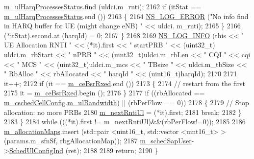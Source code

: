 \begin{DoxyCode}
      \hyperlink{classns3_1_1PssFfMacScheduler_a80badd341a079bd237ef7fe60db2cb79}{m\_ulHarqProcessesStatus}.find (uldci.m\_rnti);
2162           \textcolor{keywordflow}{if} (itStat == \hyperlink{classns3_1_1PssFfMacScheduler_a80badd341a079bd237ef7fe60db2cb79}{m\_ulHarqProcessesStatus}.end ())
2163             \{
2164               \hyperlink{group__logging_ga0261a8db1d4ac5f79417d117634fd455}{NS\_LOG\_ERROR} (\textcolor{stringliteral}{"No info find in HARQ buffer for UE (might change eNB) "} << uldci.
      m\_rnti);
2165             \}
2166           (*itStat).second.at (harqId) = 0;
2167         \}
2168 
2169       \hyperlink{group__logging_gafbd73ee2cf9f26b319f49086d8e860fb}{NS\_LOG\_INFO} (\textcolor{keyword}{this} << \textcolor{stringliteral}{" UE Allocation RNTI "} << (*it).first << \textcolor{stringliteral}{" startPRB "} << (uint32\_t)
      uldci.m\_rbStart << \textcolor{stringliteral}{" nPRB "} << (uint32\_t)uldci.m\_rbLen << \textcolor{stringliteral}{" CQI "} << cqi << \textcolor{stringliteral}{" MCS "} << (uint32\_t)uldci.m\_mcs 
      << \textcolor{stringliteral}{" TBsize "} << uldci.m\_tbSize << \textcolor{stringliteral}{" RbAlloc "} << rbAllocated << \textcolor{stringliteral}{" harqId "} << (uint16\_t)harqId);
2170 
2171       it++;
2172       \textcolor{keywordflow}{if} (it == \hyperlink{classns3_1_1PssFfMacScheduler_a7adb86186e0190e6b0aa66a562499268}{m\_ceBsrRxed}.end ())
2173         \{
2174           \textcolor{comment}{// restart from the first}
2175           it = \hyperlink{classns3_1_1PssFfMacScheduler_a7adb86186e0190e6b0aa66a562499268}{m\_ceBsrRxed}.begin ();
2176         \}
2177       \textcolor{keywordflow}{if} ((rbAllocated == \hyperlink{classns3_1_1PssFfMacScheduler_a6808e2b2024ed0ced82f80bfe6f0801f}{m\_cschedCellConfig}.\hyperlink{structns3_1_1FfMacCschedSapProvider_1_1CschedCellConfigReqParameters_a5ab5b102878e6e7e7727a14af4a64d2f}{m\_ulBandwidth}) || (rbPerFlow ==
       0))
2178         \{
2179           \textcolor{comment}{// Stop allocation: no more PRBs}
2180           \hyperlink{classns3_1_1PssFfMacScheduler_a9bbe57fde0c3046e43a686473b5e33ff}{m\_nextRntiUl} = (*it).first;
2181           \textcolor{keywordflow}{break};
2182         \}
2183     \}
2184   \textcolor{keywordflow}{while} (((*it).first != \hyperlink{classns3_1_1PssFfMacScheduler_a9bbe57fde0c3046e43a686473b5e33ff}{m\_nextRntiUl})&&(rbPerFlow!=0));
2185 
2186   \hyperlink{classns3_1_1PssFfMacScheduler_ad06e7461edc613eb44a4a9c474915022}{m\_allocationMaps}.insert (std::pair <uint16\_t, std::vector <uint16\_t> > (params.m\_sfnSf, 
      rbgAllocationMap));
2187   \hyperlink{classns3_1_1PssFfMacScheduler_aef80e10798607daea4efdf4cf1297bd9}{m\_schedSapUser}->\hyperlink{classns3_1_1FfMacSchedSapUser_a1b89636256701a84d990db7db8aea874}{SchedUlConfigInd} (ret);
2188 
2189   \textcolor{keywordflow}{return};
2190 \}
\end{DoxyCode}


